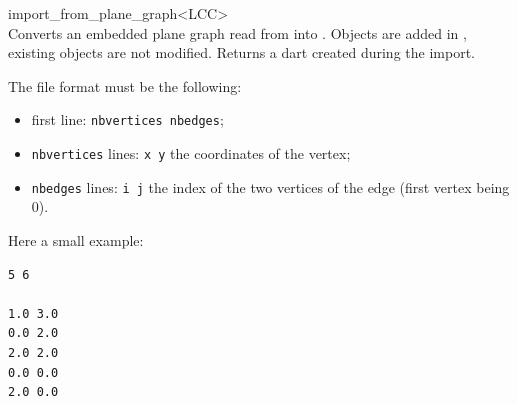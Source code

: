 \begin{ccRefFunction}{import_from_plane_graph<LCC>}
\\

{Converts an embedded plane graph read from  into . 
  Objects are added in , existing objects are not modified.
  Returns a dart created during the import.
}

The file format must be the following: 
\begin{itemize}
\item first line: \verb|nbvertices nbedges|;
\item \verb|nbvertices| lines: \verb|x y| the coordinates of the \myith{} vertex;
\item \verb|nbedges| lines: \verb|i j| the index of the two vertices of the edge (first vertex
being 0).
\end{itemize}

Here a small example:
\begin{verbatim}
5 6

1.0 3.0
0.0 2.0
2.0 2.0
0.0 0.0
2.0 0.0


\end{verbatim}
\end{ccRefFunction}
